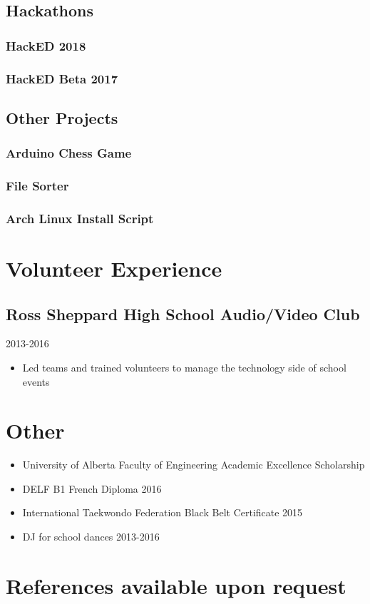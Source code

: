 \documentclass[letterpaper]{article}
\begin{document}
  \subsection{Hackathons}
    \subsubsection{HackED 2018}
    \subsubsection{HackED Beta 2017}
  \subsection{Other Projects}
    \subsubsection{Arduino Chess Game}
    \subsubsection{File Sorter}
    \subsubsection{Arch Linux Install Script}
\section{Volunteer Experience}
  \subsection{Ross Sheppard High School Audio/Video Club} \hfill 2013-2016
  \begin{itemize}
    \item Led teams and trained volunteers to manage the technology side of school events
  \end{itemize}
  
\section{Other}
  \begin{itemize}
    \item University of Alberta Faculty of Engineering Academic Excellence Scholarship
    \item DELF B1 French Diploma \hfill 2016
  \item International Taekwondo Federation Black Belt Certificate \hfill 2015
    \item DJ for school dances \hfill 2013-2016
  \end{itemize}

\section{References available upon request}
\end{document}
